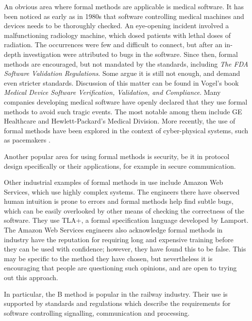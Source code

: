 \documentclass[12pt,journal,duplex]{IEEEtran}
\begin{document}
	An obvious area where formal methods are applicable is medical software. It has been noticed as early as in 1980s that software controlling medical machines and devices needs to be thoroughly checked. An eye-opening incident involved a malfunctioning radiology machine, which dosed patients with lethal doses of radiation. The occurrences were few and difficult to connect, but after an in-depth investigation were attributed to bugs in the software\cite{therac}. Since then, formal methods are encouraged, but not mandated by the standards, including \emph{The FDA Software Validation Regulations}\cite{FDA}. Some argue it is still not enough, and demand even stricter standards. Discussion of this matter can be found in Vogel's book \emph{Medical Device Software Verification, Validation, and Compliance}\cite{vogel}. Many companies developing medical software have openly declared that they use formal methods to avoid such tragic events. The most notable among them include GE Healthcare\cite{ge} and Hewlett-Packard's Medical Division\cite{hp}. More recently, the use of formal methods have been explored in the context of cyber-physical systems\cite{cyber_physical}, such as pacemakers \cite{pacemaker_kwiatkowska3}.

	Another popular area for using formal methods is security, be it in protocol design specifically\cite{security} or their applications, for example in secure communication\cite{security2}.

	Other industrial examples of formal methods in use include Amazon Web Services, which use highly complex systems\cite{amazon}. The engineers there have observed human intuition is prone to errors and formal methods help find subtle bugs, which can be easily overlooked by other means of checking the correctness of the software. They use TLA+, a formal specification language developed by Lamport\cite{TLA}. The Amazon Web Services engineers also acknowledge formal methods in industry have the reputation for requiring long and expensive training before they can be used with confidence; however, they have found this to be false. This may be specific to the method they have chosen, but nevertheless it is encouraging that people are questioning such opinions, and are open to trying out this approach.

	In particular, the B method is popular in the railway industry. Their use is supported by standards and regulations which describe the requirements for software controlling signalling, communication and processing\cite{railway standard}.
\end{document}
